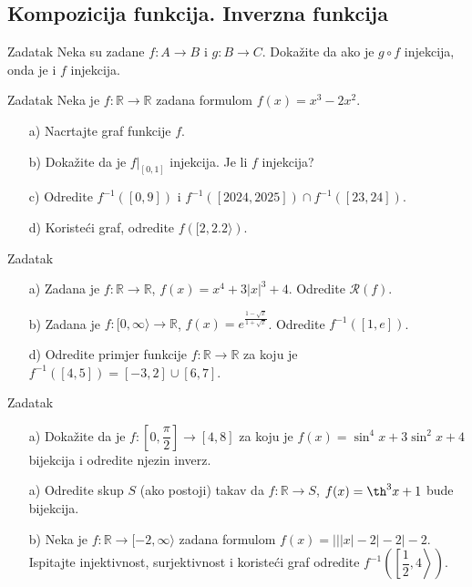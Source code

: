 \subsection*{Kompozicija funkcija. Inverzna funkcija}
\begin{exercise}{Zadatak}
Neka su zadane \(f : A\to B\) i \(g : B\to C\). Dokažite da ako je \(g\circ f\) injekcija, onda je i \(f\) injekcija.
\end{exercise}
\begin{exercise}{Zadatak}
Neka je \(f : \mathbb{R} \to \mathbb{R}\) zadana formulom \(f(x)=x^3-2x^2\).
\begin{itemize}
\item[a)] Nacrtajte graf funkcije \(f\).
\item[b)] Dokažite da je \(f|_{[0, 1]}\) injekcija. Je li \(f\) injekcija?
\item[c)] Odredite \(f^{-1}\left([0, 9]\right)\) i \(f^{-1}\left([2024, 2025]\right)\cap f^{-1}\left([23, 24]\right)\).
\item[d)] Koristeći graf, odredite \(f\left([2, 2.2\rangle\right)\).
\end{itemize}
\end{exercise}
\begin{exercise}{Zadatak} \textbf{}
\begin{itemize}
\item[a)] Zadana je \(f : \mathbb{R}\to \mathbb{R}\), \(f(x)=x^4+3|x|^3+4\). Odredite \(\mathcal{R}(f)\).
\item[b)] Zadana je \(f : [0, \infty\rangle\to \mathbb{R}\), \(f(x)=e^{\frac{1-\sqrt{x}}{1+\sqrt{x}}}\). Odredite \(f^{-1}\left([1, e]\right)\).
\item[d)] Odredite primjer funkcije \(f : \mathbb{R}\to \mathbb{R}\) za koju je \(f^{-1}\left([4, 5]\right)=[-3, 2]\cup [6, 7]\).
\end{itemize}
\end{exercise}
\begin{exercise}{Zadatak} \textbf{}
\begin{itemize}
\item[a)] Dokažite da je \(f : \left[0, \dfrac{\pi}{2}\right]\to [4, 8]\) za koju je \(f(x)=\sin^4{x}+3\sin^2{x}+4\) bijekcija i odredite njezin inverz.
\item[a)] Odredite skup \(S\) (ako postoji) takav da \(f : \mathbb{R}\to S\), \(f(x)=\th^3{x}+1\) bude bijekcija.
\item[b)] Neka je \(f : \mathbb{R}\to [-2, \infty\rangle\) zadana formulom \(f(x)=\left\lvert \left\lvert \left\lvert x\right\rvert-2\right\rvert-2\right\rvert-2\). 
Ispitajte injektivnost, surjektivnost i koristeći graf odredite \(f^{-1}\left(\left[\dfrac{1}{2}, 4\right\rangle\right)\).
\end{itemize}
\end{exercise}
